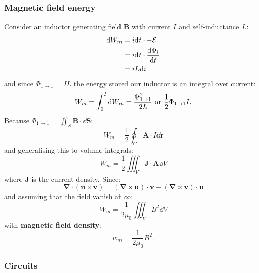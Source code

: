 \documentclass{article}
\newcommand{\vc}[1]{\boldsymbol{#1}}
\begin{document}
\begin{multicols*}{3}
\subsubsection*{Magnetic field energy}
Consider an inductor generating field $\vc{B}$
with current $I$ and self-inductance $L$:
\begin{align*}
    \dd W_m
    &=i\dd t\cdot -\mathcal{E} \\
    &=i\dd t\cdot\dv{\Phi_i}{t} \\
    &=iL\dd i
\end{align*}
and since $\Phi_{1\rightarrow1}=IL$
the energy stored our inductor is an integral over current:
$$W_m=\int_{0}^{I}\dd W_m=\frac{\Phi_{1\rightarrow1}^2}{2L}
\hspace{0.05in}\text{or}\hspace{0.05in}
\frac{1}{2}\Phi_{1\rightarrow1} I.$$
Because
$\displaystyle\Phi_{1\rightarrow1}=\iint_S\vc{B}\cdot\dd\vc{S}$:
$$W_m=\frac{1}{2}\oint_C\vc{A}\cdot I\dd\vc{r}$$
and generalising this to volume integrals:
$$W_m=\frac{1}{2}\iiint_V\vc{J}\cdot\vc{A}\dd V$$
where $\vc{J}$ is the current density. Since:
$$\vc{\nabla}\cdot(\vc{u}\times\vc{v})
=(\vc{\nabla}\times\vc{u})\cdot\vc{v}
-(\vc{\nabla}\times\vc{v})\cdot\vc{u}$$
and assuming that the field vanish at $\infty$:
$$W_m=\frac{1}{2\mu_0}\iiint_V B^2\dd V$$
with \textbf{magnetic field density}:
$$w_m=\frac{1}{2\mu_0}B^2.$$

\subsubsection*{Circuits}
\end{multicols*}
\end{document}
